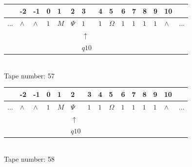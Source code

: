\documentclass[11pt]{article}
\begin{document}
\begin{table}[H]
\centering
\begin{tabular}{lllllllllllllll}
 & -2 & -1 & 0 & 1 & 2 & 3 & 4 & 5 & 6 & 7 & 8 & 9 & 10 & \\
\hline
$...$ & \multicolumn{1}{|l|}{$\wedge$} & \multicolumn{1}{|l|}{$\wedge$} & \multicolumn{1}{|l|}{$1$} & \multicolumn{1}{|l|}{$M$} & \multicolumn{1}{|l|}{$\Psi$} & \multicolumn{1}{|l|}{$1$} & \multicolumn{1}{|l|}{$1$} & \multicolumn{1}{|l|}{$\Omega$} & \multicolumn{1}{|l|}{$1$} & \multicolumn{1}{|l|}{$1$} & \multicolumn{1}{|l|}{$1$} & \multicolumn{1}{|l|}{$1$} & \multicolumn{1}{|l|}{$\wedge$} & $...$\\
\hline
&  &  &  &  &  & $\uparrow$ &  &  &  &  &  &  &  &  \\
&  &  &  &  &  & $ q10 $ &  &  &  &  &  &  &  &  \\
\end{tabular}
\\
Tape number: 57
\noindent\makebox[\linewidth]{\hdashrule{\textwidth}{1pt}{1pt}}\end{table}

\begin{table}[H]
\centering
\begin{tabular}{lllllllllllllll}
 & -2 & -1 & 0 & 1 & 2 & 3 & 4 & 5 & 6 & 7 & 8 & 9 & 10 & \\
\hline
$...$ & \multicolumn{1}{|l|}{$\wedge$} & \multicolumn{1}{|l|}{$\wedge$} & \multicolumn{1}{|l|}{$1$} & \multicolumn{1}{|l|}{$M$} & \multicolumn{1}{|l|}{$\Psi$} & \multicolumn{1}{|l|}{$1$} & \multicolumn{1}{|l|}{$1$} & \multicolumn{1}{|l|}{$\Omega$} & \multicolumn{1}{|l|}{$1$} & \multicolumn{1}{|l|}{$1$} & \multicolumn{1}{|l|}{$1$} & \multicolumn{1}{|l|}{$1$} & \multicolumn{1}{|l|}{$\wedge$} & $...$\\
\hline
&  &  &  &  & $\uparrow$ &  &  &  &  &  &  &  &  &  \\
&  &  &  &  & $ q10 $ &  &  &  &  &  &  &  &  &  \\
\end{tabular}
\\
Tape number: 58
\noindent\makebox[\linewidth]{\hdashrule{\textwidth}{1pt}{1pt}}\end{table}
\end{document}
